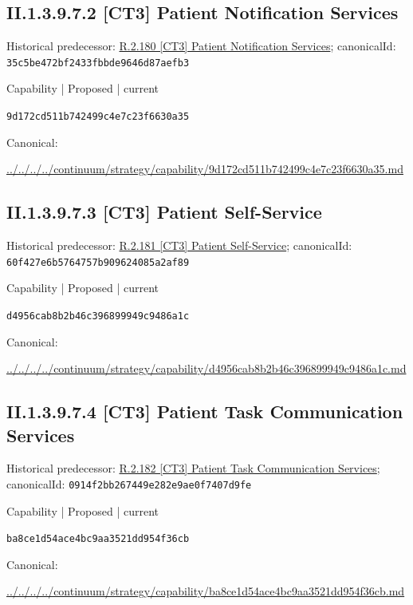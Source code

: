 \documentclass[10pt,a4paper]{article}
\begin{document}
\subsection*{II.1.3.9.7.2 [CT3] Patient Notification Services}
Historical predecessor: \hyperref[element-35c5be472bf2433fbbde9646d87aefb3]{R.2.180 [CT3] Patient Notification Services}; canonicalId: \texttt{35c5be472bf2433fbbde9646d87aefb3}\par
\label{element-9d172cd511b742499c4e7c23f6630a35}
{\small Capability | Proposed | current}\par
\texttt{9d172cd511b742499c4e7c23f6630a35}\par
Canonical: \par
{\footnotesize\url{../../../../continuum/strategy/capability/9d172cd511b742499c4e7c23f6630a35.md}}\par
\subsection*{II.1.3.9.7.3 [CT3] Patient Self-Service}
Historical predecessor: \hyperref[element-60f427e6b5764757b909624085a2af89]{R.2.181 [CT3] Patient Self-Service}; canonicalId: \texttt{60f427e6b5764757b909624085a2af89}\par
\label{element-d4956cab8b2b46c396899949c9486a1c}
{\small Capability | Proposed | current}\par
\texttt{d4956cab8b2b46c396899949c9486a1c}\par
Canonical: \par
{\footnotesize\url{../../../../continuum/strategy/capability/d4956cab8b2b46c396899949c9486a1c.md}}\par
\subsection*{II.1.3.9.7.4 [CT3] Patient Task Communication Services}
Historical predecessor: \hyperref[element-0914f2bb267449e282e9ae0f7407d9fe]{R.2.182 [CT3] Patient Task Communication Services}; canonicalId: \texttt{0914f2bb267449e282e9ae0f7407d9fe}\par
\label{element-ba8ce1d54ace4bc9aa3521dd954f36cb}
{\small Capability | Proposed | current}\par
\texttt{ba8ce1d54ace4bc9aa3521dd954f36cb}\par
Canonical: \par
{\footnotesize\url{../../../../continuum/strategy/capability/ba8ce1d54ace4bc9aa3521dd954f36cb.md}}\par
\end{document}
